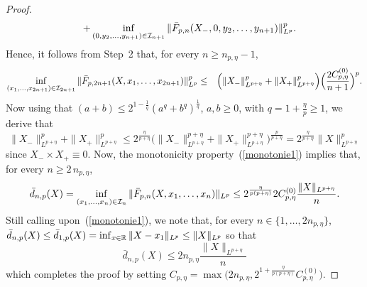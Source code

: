 \begin{proof}
\begin{eqnarray*}
  &&+ \inf_{ (0,y_2,\ldots,y_{n+1})\in {\cal I}_{n+1}}\|\bar F_{p,n}(X_-,0,y_2,\ldots,y_{n+1}) \|^p_{L^p}  .
  \end{eqnarray*} 
   Hence,  it follows from Step~2 that, for every  $n\ge n_{p,\eta}-1$,
\begin{eqnarray*}  
 \inf_{ (x_1,\ldots,x_{2n+1})\in {\cal I}_{2n+1}}\|\bar
 F_{p,2n+1}(X,x_1,\ldots,x_{2n+1})\|^p_{L^p}   &\le & \Big(
 \|X_-\|^p_{L^{p+\eta}} +\|X_+\|^p_{L^{p+\eta}}
 \Big)\Big(\frac{2C^{(0)}_{p,\eta} }{n+1}\Big)^p.
 \end{eqnarray*} 
 Now using that $(a+b)\le2^{1-\frac 1q} (a^q+b^q)^{\frac 1q}$, $a,b\ge 0$, with $q=1+\frac{\eta}{p}\ge 1$, we derive that
 \[
  \|X_-\|^p_{L^{p+\eta}} +\|X_+\|^p_{L^{p+\eta}} \le 2^{\frac{\eta}{p+\eta}} \Big(\|X_-\|^{p+\eta}_{L^{p+\eta}} +\|X_+\|^{p+\eta}_{L^{p+\eta}} \Big)^{\frac{p}{p+\eta}}= 2^{\frac{\eta}{p+\eta}}  \|X\|_{L^{p+\eta}}^p
 \]
 since $X_-\times X_+\equiv 0$. 
Now, the monotonicity property~(\ref{monotonie1})  implies that, for every $n\ge 2\,n_{p,\eta}$,
 \[
 \bar d_{n,p}(X)=  \inf_{ (x_1,\ldots,x_{n})\in {\cal I}_{n}}\|\bar F_{p,n}(X,x_1,\ldots,x_{n})\|_{L^p}\le 2^{\frac{\eta}{p(p+\eta)}}2C^{(0)}_{p,\eta}\frac{\|X\|_{L^{p+\eta}} }{n}.
 \]
Still calling upon~(\ref{monotonie1}), we note that, for every $n\!\in\{1,\ldots,2n_{p,\eta}\}$, $\bar d_{n,p}(X)\le \bar d_{1,p}(X) = \inf_{x \in \mathbb{R}}\|X-x_1\|_{L^p}\le \|X\|_{L^p}$ so that
\[
\bar d_{n,p}(X)\le 2n_{p,\eta} \frac{ \|X\|_{L^{p+\eta}}}{n}
\]
which completes the proof by setting $C_{p,\eta} = \max\big(2n_{p,\eta},2^{1+\frac{\eta}{p(p+\eta)}}C^{(0)}_{p,\eta}\big)$.
%
 \end{proof}
 
